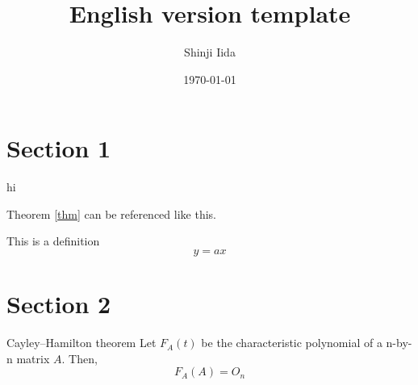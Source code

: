 \documentclass[12pt,dvipdfmx]{article}
\theoremstyle{definition} %
\theoremstyle{remark}
\newtheorem*{rem}{Remark}
\begin{document}
\title{English version template}
\author{Shinji Iida}
\date{\today}
\maketitle


\section{Section 1}
%

\begin{thm}[label=thm]{}{}
hi
\end{thm}
Theorem \ref{thm} can be referenced like this.

\begin{dfn}{This is a definition}{}
\begin{equation}
y  = ax
\end{equation}
\end{dfn}


\section{Section 2}
\begin{thm}{Cayley--Hamilton theorem}{}
Let $F_{A}(t)$ be the characteristic polynomial of a n-by-n matrix $A$. Then,
\begin{equation}
F_{A}(A)=O_{n}
\end{equation}

\end{thm}


%
%
\end{document}
